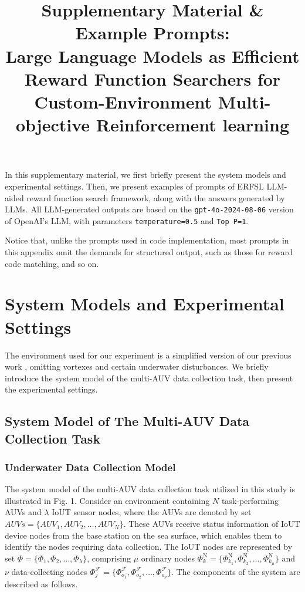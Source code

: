 \documentclass{article}
\title{\textbf{Supplementary Material \& Example Prompts: \\
   Large Language Models as Efficient Reward Function Searchers for Custom-Environment Multi-objective Reinforcement learning}}
\author{}
\date{}
\begin{document}
   \maketitle
   In this supplementary material, we first briefly present the system models and experimental settings. Then, we present examples of prompts of ERFSL LLM-aided reward function search framework, along with the answers generated by LLMs. All LLM-generated outputs are based on the \verb|gpt-4o-2024-08-06| version of OpenAI's LLM, with parameters \verb|temperature=0.5| and \verb|Top P=1|. %
   
  Notice that, unlike the prompts used in code implementation, most prompts in this appendix omit the demands for structured output, such as those for reward code matching, and so on.
   
\tableofcontents
\newpage
\section{System Models and Experimental Settings} 

The environment used for our experiment is a simplified version of our previous work \cite{1}, omitting vortexes and certain underwater disturbances. We briefly introduce the system model of the multi-AUV data collection task, then present the experimental settings.

\subsection{System Model of The Multi-AUV Data Collection Task}
\subsubsection{Underwater Data Collection Model}
The system model of the multi-AUV data collection task utilized in this study is illustrated in Fig. 1. Consider an environment containing $N$ task-performing AUVs and $\lambda$ IoUT sensor nodes, where the AUVs are denoted by set $AUVs=\{AUV_1,AUV_2,\ldots,AUV_N\}$. These AUVs receive status information of IoUT device nodes from the base station on the sea surface, which enables them to identify the nodes requiring data collection. The IoUT nodes are represented by set $\Phi=\{\Phi_{1},\Phi_{2},\ldots,\Phi_{\lambda}\}$, comprising $\mu$ ordinary nodes $\Phi_{k}^{\mathrm{N}}=\{\Phi_{k_{1}}^{\mathrm{N}},\Phi_{k_{2}}^{\mathrm{N}},\ldots,\Phi_{k_{\mu}}^{\mathrm{N}}\}$ and $\nu$ data-collecting nodes $\Phi_{j}^{\mathcal{F}}=\{\Phi_{o_{1}}^{\mathcal{F}},\Phi_{o_{2}}^{\mathcal{F}},\ldots,\Phi_{o_{\nu}}^{\mathcal{F}}\}$. The components of the system are described as follows.
\end{document}
